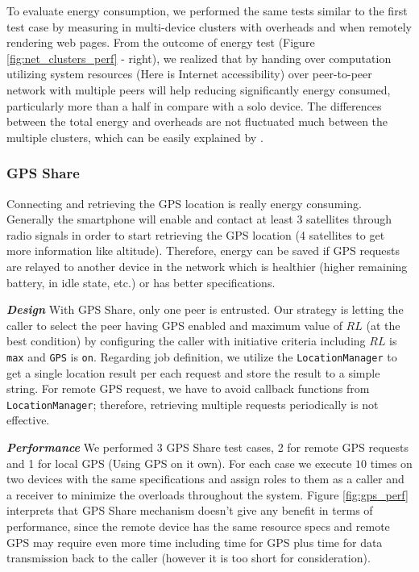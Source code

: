 \documentclass{sig-alternate}[10pt]
\begin{document}
To evaluate energy consumption, we performed the same tests similar to the first test case by measuring in multi-device clusters with overheads and when remotely rendering web pages. From the outcome of energy test (Figure \ref{fig:net_clusters_perf} - right), we realized that by handing over computation utilizing system resources (Here is Internet accessibility) over peer-to-peer network with multiple peers will help reducing significantly energy consumed, particularly more than a half in compare with a solo device. The differences between the total energy and overheads are not fluctuated much between the multiple clusters, which can be easily explained by \cite{wifi_energy}.\\


\subsubsection{GPS Share}
Connecting and retrieving the GPS location is really energy consuming. Generally the smartphone will enable and contact at least 3 satellites through radio signals in order to start retrieving the GPS location (4 satellites to get more information like altitude). Therefore, energy can be saved if GPS requests are relayed to another device in the network which is healthier (higher remaining battery, in idle state, etc.) or has better specifications.

\textbf{\emph{Design}}
With GPS Share, only one peer is entrusted. Our strategy is letting the caller to select the peer having GPS enabled and maximum value of $RL$ (at the best condition) by configuring the caller with initiative criteria including $RL$ is \texttt{max} and \texttt{GPS} is \texttt{on}. Regarding job definition, we utilize the \texttt{LocationManager} to get a single location result per each request and store the result to a simple string. For remote GPS request, we have to avoid callback functions from \texttt{LocationManager}; therefore, retrieving multiple requests periodically is not effective.


\textbf{\emph{Performance}}
We performed 3 GPS Share test cases, 2 for remote GPS requests and 1 for local GPS (Using GPS on it own). For each case we execute $10$ times on two devices with the same specifications and assign roles to them as a caller and a receiver to minimize the overloads throughout the system. Figure \ref{fig:gps_perf} interprets that GPS Share mechanism doesn't give any benefit in terms of performance, since the remote device has the same resource specs and remote GPS may require even more time including time for GPS plus time for data transmission back to the caller (however it is too short for consideration).
\end{document}

